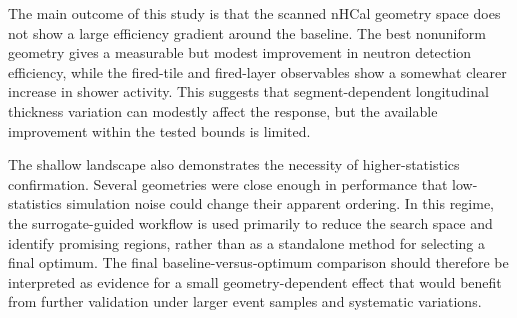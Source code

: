 \noindent The main outcome of this study is that the scanned nHCal geometry space does not show a large efficiency gradient around the baseline. The best nonuniform geometry gives a 
measurable but modest improvement in neutron detection efficiency, while the fired-tile and fired-layer observables show a somewhat clearer increase in shower activity. This suggests 
that segment-dependent longitudinal thickness variation can modestly affect the response, but the available improvement within the tested bounds is limited.

\noindent The shallow landscape also demonstrates the necessity of higher-statistics confirmation. Several geometries were close enough in performance that low-statistics simulation 
noise could change their apparent ordering. In this regime, the surrogate-guided workflow is used primarily to reduce the search space and identify promising regions, rather than as 
a standalone method for selecting a final optimum. The final baseline-versus-optimum comparison should therefore be interpreted as evidence for a small geometry-dependent effect that 
would benefit from further validation under larger event samples and systematic variations.
